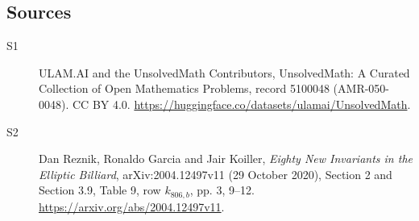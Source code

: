 \documentclass[11pt]{article}
\begin{document}
\subsection{Sources}
\begin{description}
\item[\hypertarget{source:5100048:1}{S1}] ULAM.AI and the UnsolvedMath Contributors, UnsolvedMath: A Curated Collection of Open Mathematics Problems, record 5100048 (AMR-050-0048). CC BY 4.0. \url{https://huggingface.co/datasets/ulamai/UnsolvedMath}.
\item[\hypertarget{source:5100048:2}{S2}] Dan Reznik, Ronaldo Garcia and Jair Koiller, \emph{Eighty New Invariants in the Elliptic Billiard}, arXiv:2004.12497v11 (29 October 2020), Section 2 and Section 3.9, Table 9, row $k_{806,b}$, pp. 3, 9--12. \url{https://arxiv.org/abs/2004.12497v11}.
\end{description}
\label{end:5100048}
\end{document}
